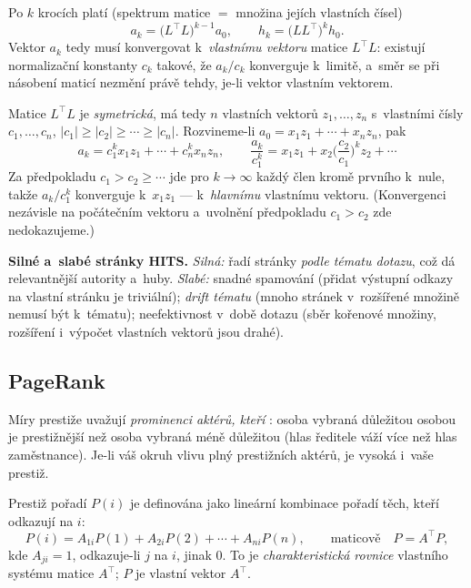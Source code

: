 \documentclass[11pt,a4paper]{article}
\theoremstyle{definition}
\begin{document}
\begin{defbox}
Po $k$ krocích platí (spektrum matice $=$ množina jejích vlastních čísel)
\[ a_k=\big(L^{\!\top}L\big)^{k-1}a_0,\qquad h_k=\big(LL^{\!\top}\big)^{k}h_0. \]
Vektor $a_k$ tedy musí konvergovat k~\emph{vlastnímu vektoru} matice $L^{\!\top}L$: existují
normalizační konstanty $c_k$ takové, že $a_k/c_k$ konverguje k~limitě, a~směr se při násobení
maticí nezmění právě tehdy, je-li vektor vlastním vektorem.

Matice $L^{\!\top}L$ je \emph{symetrická}, má tedy $n$ vlastních vektorů $z_1,\dots,z_n$
s~vlastními čísly $c_1,\dots,c_n$, $|c_1|\ge|c_2|\ge\cdots\ge|c_n|$. Rozvineme-li
$a_0=x_1z_1+\cdots+x_nz_n$, pak
\[ a_k=c_1^{k}x_1z_1+\cdots+c_n^{k}x_nz_n,\qquad
   \frac{a_k}{c_1^{k}}=x_1z_1+x_2\Big(\frac{c_2}{c_1}\Big)^{\!k}z_2+\cdots \]
Za předpokladu $c_1>c_2\ge\cdots$ jde pro $k\to\infty$ každý člen kromě prvního k~nule, takže
$a_k/c_1^k$ konverguje k~$x_1z_1$ --- k~\emph{hlavnímu} vlastnímu vektoru. (Konvergenci
nezávisle na počátečním vektoru a~uvolnění předpokladu $c_1>c_2$ zde nedokazujeme.)
\end{defbox}

\textbf{Silné a~slabé stránky HITS.} \emph{Silná:} řadí stránky \emph{podle tématu dotazu}, což
dá relevantnější autority a~huby. \emph{Slabé:} snadné spamování (přidat výstupní odkazy na
vlastní stránku je triviální); \emph{drift tématu} (mnoho stránek v~rozšířené množině nemusí být
k~tématu); neefektivnost v~době dotazu (sběr kořenové množiny, rozšíření i~výpočet vlastních
vektorů jsou drahé).

\subsection{PageRank}
\label{ssec:pagerank}

\begin{defbox}
Míry prestiže uvažují \emph{prominenci aktérů, kteří }: osoba vybraná důležitou
osobou je prestižnější než osoba vybraná méně důležitou (hlas ředitele váží více než hlas
zaměstnance). Je-li váš okruh vlivu plný prestižních aktérů, je vysoká i~vaše prestiž.

Prestiž pořadí $P(i)$ je definována jako lineární kombinace pořadí těch, kteří odkazují na $i$:
\[ P(i)=A_{1i}P(1)+A_{2i}P(2)+\cdots+A_{ni}P(n),\qquad\text{maticově}\quad P=A^{\!\top}P, \]
kde $A_{ji}=1$, odkazuje-li $j$ na $i$, jinak 0. To je \emph{charakteristická rovnice}
vlastního systému matice $A^{\!\top}$; $P$ je vlastní vektor $A^{\!\top}$.
\end{defbox}
\end{document}
